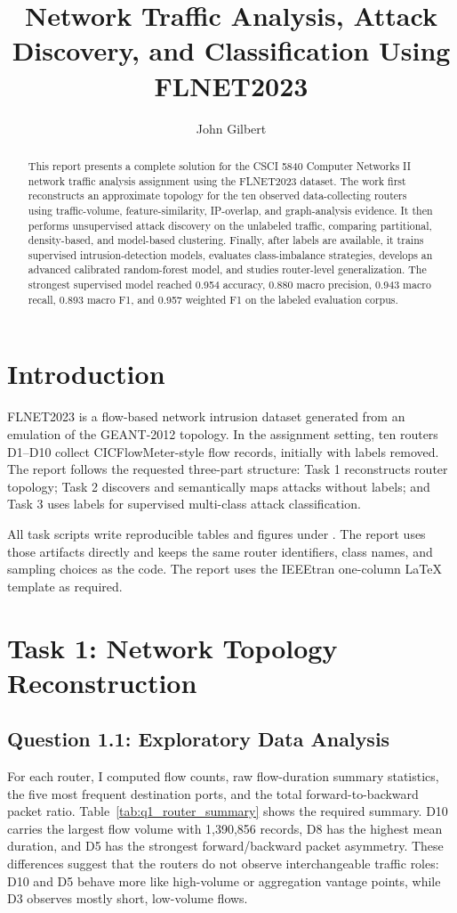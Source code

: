 \documentclass[journal,onecolumn]{IEEEtran}
\title{Network Traffic Analysis, Attack Discovery, and Classification Using FLNET2023}
\author{John Gilbert}
\begin{document}
\maketitle

\begin{abstract}
This report presents a complete solution for the CSCI 5840 Computer Networks II network traffic analysis assignment using the FLNET2023 dataset. The work first reconstructs an approximate topology for the ten observed data-collecting routers using traffic-volume, feature-similarity, IP-overlap, and graph-analysis evidence. It then performs unsupervised attack discovery on the unlabeled traffic, comparing partitional, density-based, and model-based clustering. Finally, after labels are available, it trains supervised intrusion-detection models, evaluates class-imbalance strategies, develops an advanced calibrated random-forest model, and studies router-level generalization. The strongest supervised model reached 0.954 accuracy, 0.880 macro precision, 0.943 macro recall, 0.893 macro F1, and 0.957 weighted F1 on the labeled evaluation corpus.
\end{abstract}

\section{Introduction}
FLNET2023 is a flow-based network intrusion dataset generated from an emulation of the GEANT-2012 topology. In the assignment setting, ten routers D1--D10 collect CICFlowMeter-style flow records, initially with labels removed. The report follows the requested three-part structure: Task 1 reconstructs router topology; Task 2 discovers and semantically maps attacks without labels; and Task 3 uses labels for supervised multi-class attack classification.

All task scripts write reproducible tables and figures under . The report uses those artifacts directly and keeps the same router identifiers, class names, and sampling choices as the code. The report uses the IEEEtran one-column LaTeX template as required.

\section{Task 1: Network Topology Reconstruction}

\subsection{Question 1.1: Exploratory Data Analysis}
For each router, I computed flow counts, raw flow-duration summary statistics, the five most frequent destination ports, and the total forward-to-backward packet ratio. Table~\ref{tab:q1_router_summary} shows the required summary. D10 carries the largest flow volume with 1,390,856 records, D8 has the highest mean duration, and D5 has the strongest forward/backward packet asymmetry. These differences suggest that the routers do not observe interchangeable traffic roles: D10 and D5 behave more like high-volume or aggregation vantage points, while D3 observes mostly short, low-volume flows.
\end{document}

